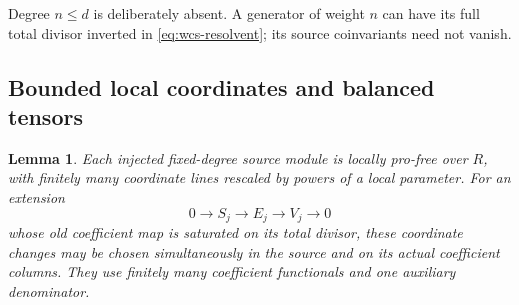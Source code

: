 \documentclass[11pt]{article}
\newtheorem{lemma}[theorem]{Lemma}
\theoremstyle{definition}\newtheorem{definition}[theorem]{Definition}
\begin{document}
Degree \(n\leq d\) is deliberately absent.  A generator of weight
\(n\) can have its full total divisor inverted in
\eqref{eq:wcs-resolvent}; its source coinvariants need not vanish.

\subsection{Bounded local coordinates and balanced tensors}

\begin{lemma}\label{lem:wcs-local-coordinates}
Each injected fixed-degree source module is locally pro-free
over \(R\), with finitely many coordinate lines rescaled by powers
of a local parameter.  For an extension
\[
 0\longrightarrow S_j\longrightarrow E_j\longrightarrow V_j
       \longrightarrow0
\]
whose old coefficient map is saturated on its total divisor, these
coordinate changes may be chosen simultaneously in the source and
on its actual coefficient columns.  They use finitely many
coefficient functionals and one auxiliary denominator.
\end{lemma}
\end{document}
